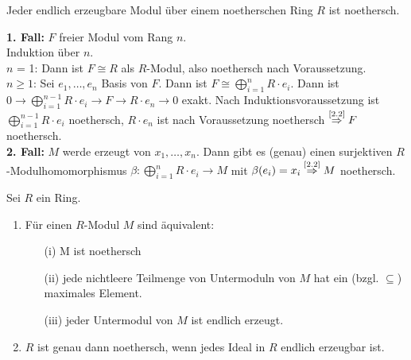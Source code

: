 \documentclass[a4paper, 10pt]{report}
\begin{document}
\begin{Folg}
\label{2.3}
  Jeder endlich erzeugbare Modul über einem noetherschen Ring $R$ ist
  noethersch.
\end{Folg}

\begin{Bew}
  \textbf{1. Fall:} $F$ freier Modul vom Rang $n$.\\
  Induktion über $n$.\\
  $n$ = 1: Dann ist $F \cong R$ als $R$-Modul, also noethersch nach
  Voraussetzung.\\
  $n \ge 1$: Sei $e_1, \dots , e_n$ Basis von $F$. Dann ist $F \cong
  \bigoplus_{i = 1}^n R \cdot e_i$. Dann ist $0 \to \bigoplus_{i = 1}^{n-1} R \cdot
  e_i \to F \to R \cdot e_n \to 0$ exakt. Nach Induktionsvoraussetzung ist
  $\bigoplus_{i = 1}^{n-1} R \cdot e_i$ noethersch, $R \cdot e_n$ ist nach
  Voraussetzung noethersch $\overset{\text{\scriptsize \ref{2.2}}}{\Rightarrow}
  F$ noethersch.\\
  \textbf{2. Fall:} $M$ werde erzeugt von $x_1, \dots , x_n$. Dann gibt es
  (genau) einen surjektiven $R$-Modulhomomorphismus $\beta: \bigoplus_{i = 1}^n
  R \cdot e_i \to M$ mit $\beta(e_i) = x_i \overset{\text{\scriptsize
  \ref{2.2}}}{\Rightarrow} M$ noethersch.
\end{Bew}

\begin{Prop}
  Sei $R$ ein Ring.
  \begin{enumerate}
    \item \label{2.4a}Für einen $R$-Modul $M$ sind äquivalent:
      \begin{enumerate}
        \item[(i)] M ist noethersch
        \item[(ii)] jede nichtleere Teilmenge von Untermoduln von $M$ hat ein
                    (bzgl. $\subseteq$) maximales Element.
        \item[(iii)] jeder Untermodul von $M$ ist endlich erzeugt.
      \end{enumerate}
    \item $R$ ist genau dann noethersch, wenn jedes Ideal in $R$ endlich
          erzeugbar ist.
  \end{enumerate}
\end{Prop}
\end{document}
